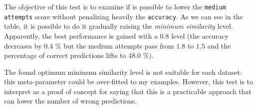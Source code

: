 
The objective of this test is to examine if is possible to lower the \texttt{medium attempts} score without penalizing heavily the \texttt{accuracy}. As we can see in the table, it is possible to do it gradually raising the \textit{minimum similarity} level. Apparently, the best performance is gained with a $0.8$ level (the accuracy decreases by 0.4 \% but the medium attempts pass from $1.8$ to $1.5$ and the percentage of correct predictions lifts to 48.0 \%).

The found optimum minimum similarity level is not suitable for each dataset: this meta-parameter could be over-fitted to my examples. However, this test is to interpret as a proof of concept for saying that this is a practicable approach that can lower the number of wrong predictions.

